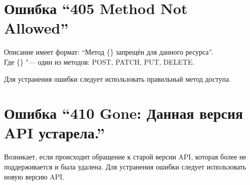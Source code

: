 \section*{Ошибка ``405 Method Not Allowed''}
Описание имеет формат: ``Метод \{\} запрещён для данного ресурса''.\\
Где \{\} "--- один из методов: POST, PATCH, PUT, DELETE\@.

Для устранения ошибки следует использовать правильный метод доступа.

\section*{Ошибка ``410 Gone: Данная версия API устарела.''}
Возникает, если происходит обращение к старой версии API, которая более не поддерживается и была удалена.
Для устранения ошибки следует использовать новую версию API\@.
